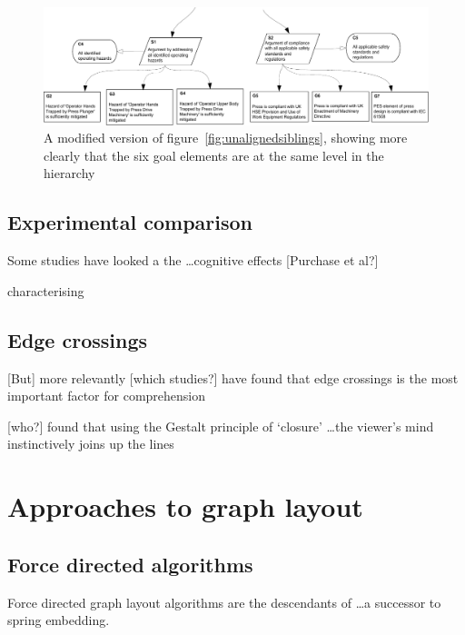 \begin{figure}
    \includegraphics[width=\textwidth]{graphics/aligned_siblings.pdf}
    \caption{A modified version of figure~\ref{fig:unalignedsiblings},
            showing more clearly that the six goal elements are at the same level in the hierarchy}
    \label{fig:alignedsiblings}
\end{figure}


\subsection{Experimental comparison} 

\citeauthor{DiBattista1997303}

Some studies have looked a the  \ldots cognitive effects [Purchase et al?]

characterising 


\subsection{Edge crossings}


[But] more relevantly [which studies?] have found that edge crossings is the most important factor for comprehension

[who?] found that using the Gestalt principle of `closure' \ldots the viewer's mind instinctively joins up the lines




\section{Approaches to graph layout}

\subsection{Force directed algorithms}

Force directed graph layout algorithms are the descendants of  \citet{tutte} \ldots a successor to \citet{tutte} spring embedding.


